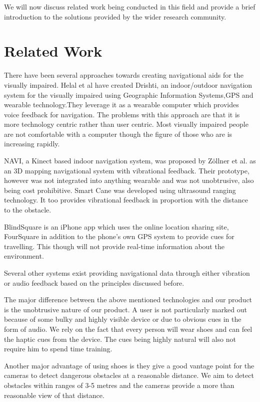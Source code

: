 \documentclass[11pt]{report}
\begin{document}
{We will now discuss related work being conducted in this field and provide a brief introduction to the solutions provided by the wider research community.



\section{Related Work}

There have been several approaches towards creating navigational aids for the visually impaired. Helal et al\cite{helal2001drishti,ran2004drishti} have created Drishti, an indoor/outdoor navigation system for the visually impaired using Geographic Information Systems,GPS and wearable technology.They leverage it as a wearable computer which provides voice feedback for navigation. The problems with this approach are that it is more technology centric rather than user centric. Most visually impaired people are not comfortable with a computer though the figure of those who are is increasing rapidly. 

NAVI, a Kinect based indoor navigation system\cite{Zollner20118609458}, was proposed by Z\"{o}llner et al. as an 3D mapping navigational system with vibrational feedback. Their prototype, however was not integrated into anything wearable and was not unobtrusive, also being cost prohibitive. Smart Cane \cite{sakhardande2012smart} was developed using ultrasound ranging technology. It too provides vibrational feedback in proportion with the distance to the obstacle.

BlindSquare\cite{blindsquare} is an iPhone app which uses the online location sharing site, FourSquare in addition to the phone's own GPS system to provide cues for travelling. This though will not provide real-time information about the environment.      

Several other systems exist providing navigational data through either vibration or audio feedback based on the principles discussed before. 

The major difference between the above mentioned technologies and our product is the unobtrusive nature of our product. A user is not particularly marked out because of some bulky and highly visible device or due to obvious cues in the form of audio. We rely on the fact that every person will wear shoes and can feel the haptic cues from the device. The cues being highly natural will also not require him to spend time training. 

Another major advantage of using shoes is they give a good vantage point for the cameras to detect dangerous obstacles at a reasonable distance. We aim to detect obstacles within ranges of 3-5 metres and the cameras provide a more than reasonable view of that distance. 

}
\end{document}
